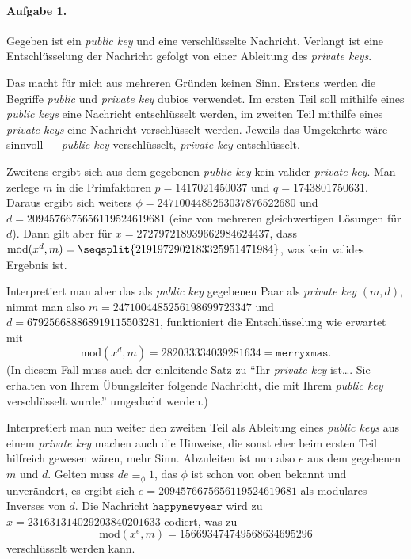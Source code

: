 \documentclass{article}
\newcommand{\cmod}{\text{mod}}
\begin{document}
\paragraph{Aufgabe 1.}

Gegeben ist ein \emph{public key} und eine verschlüsselte Nachricht. Verlangt ist eine Entschlüsselung der Nachricht gefolgt von einer Ableitung des \emph{private keys}.

Das macht für mich aus mehreren Gründen keinen Sinn. Erstens werden die Begriffe \emph{public} und \emph{private key} dubios verwendet. Im ersten Teil soll mithilfe eines \emph{public keys} eine Nachricht entschlüsselt werden, im zweiten Teil mithilfe eines \emph{private keys} eine Nachricht verschlüsselt werden. Jeweils das Umgekehrte wäre sinnvoll --- \emph{public key} verschlüsselt, \emph{private key} entschlüsselt.

Zweitens ergibt sich aus dem gegebenen \emph{public key} kein valider \emph{private key}. Man zerlege $m$ in die Primfaktoren $p = 1417021450037$ und $q = 1743801750631$. Daraus ergibt sich weiters $\phi = 2471004485253037876522680$ und $d = 2094576675656119524619681$ (eine von mehreren gleichwertigen Lösungen für $d$). Dann gilt aber für $x = 272797218939662984624437$, dass $\cmod(x^d, m) = \seqsplit{2191972902183325951471984}$, was kein valides Ergebnis ist.

Interpretiert man aber das als \emph{public key} gegebenen Paar als \emph{private key} $(m, d)$, nimmt man also $m = 2471004485256198699723347$ und $d = 679256688868919115503281$, funktioniert die Entschlüsselung wie erwartet mit
\begin{equation*}
    \cmod(x^d, m) = 282033334039281634 = \texttt{merryxmas}.
\end{equation*} (In diesem Fall muss auch der einleitende Satz zu \enquote{Ihr \emph{private key} ist\ldots. Sie erhalten von Ihrem Übungsleiter folgende Nachricht, die mit Ihrem \emph{public key} verschlüsselt wurde.} umgedacht werden.)

Interpretiert man nun weiter den zweiten Teil als Ableitung eines \emph{public keys} aus einem \emph{private key} machen auch die Hinweise, die sonst eher beim ersten Teil hilfreich gewesen wären, mehr Sinn. Abzuleiten ist nun also $e$ aus dem gegebenen $m$ und $d$. Gelten muss $de \equiv_{\phi} 1$, das $\phi$ ist schon von oben bekannt und unverändert, es ergibt sich $e = 2094576675656119524619681$ als modulares Inverses von $d$. Die Nachricht $\texttt{happynewyear}$ wird zu $x = 231631314029203840201633$ codiert, was zu
\begin{equation*}
    \cmod(x^e, m) = 156693474749568634695296
\end{equation*}
verschlüsselt werden kann.
\end{document}
